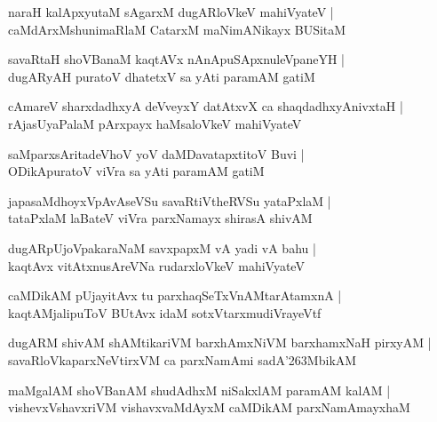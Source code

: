 \documentclass[twoside,12pt,openright]{book}
\def\S{\char'263}
\newcounter{shloka}[chapter]
\begin{document}
\begin{shloka}%
naraH kalApxyutaM sAgarxM dugARloVkeV mahiVyateV |\\
caMdArxMshunimaRlaM CatarxM maNimANikayx BUSitaM 
\end{shloka}

\begin{shloka}%
savaRtaH shoVBanaM kaqtAVx nAnApuSApxnuleVpaneYH |\\
dugARyAH puratoV dhatetxV sa yAti paramAM gatiM 
\end{shloka}

\begin{shloka}%
cAmareV sharxdadhxyA deVveyxY datAtxvX ca shaqdadhxyAnivxtaH |\\
rAjasUyaPalaM pArxpayx haMsaloVkeV mahiVyateV 
\end{shloka}

\begin{shloka}%
saMparxsAritadeVhoV yoV daMDavatapxtitoV Buvi |\\
ODikApuratoV viVra sa yAti paramAM gatiM 
\end{shloka}

\begin{shloka}%
japasaMdhoyxVpAvAseVSu  savaRtiVtheRVSu yataPxlaM |\\
tataPxlaM laBateV viVra parxNamayx shirasA shivAM
\end{shloka}

\begin{shloka}%
dugARpUjoVpakaraNaM savxpapxM vA yadi vA bahu |\\
kaqtAvx vitAtxnusAreVNa rudarxloVkeV mahiVyateV 
\end{shloka}

\begin{shloka}%
caMDikAM pUjayitAvx tu parxhaqSeTxVnAMtarAtamxnA |\\
kaqtAMjalipuToV BUtAvx idaM sotxVtarxmudiVrayeVtf
\end{shloka}

\begin{shloka}%
dugARM shivAM shAMtikariVM barxhAmxNiVM barxhamxNaH pirxyAM |\\
savaRloVkaparxNeVtirxVM ca parxNamAmi sadA\S MbikAM 
\end{shloka}

\begin{shloka}%
maMgalAM shoVBanAM shudAdhxM niSakxlAM paramAM kalAM |\\
vishevxVshavxriVM vishavxvaMdAyxM caMDikAM parxNamAmayxhaM 
\end{shloka}
\end{document}
